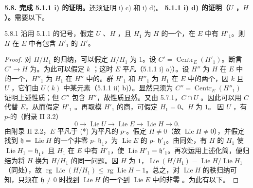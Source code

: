 \textbf{5.8. 完成 5.1.1 i) 的证明。}还须证明 i) c) 和 i) d)。
\textbf{5.1.1 i) d) 的证明（$U$ ，$H$ ）。}需要以下。
\begin{SGAresult}{}{5.8.1}
沿用 5.1.1 的记号，假定 $U$ 、$H$ ，且 $H_1$ 为 $H$ 的一个，在 $E$ 中有 $H'_1$。则 $H$ 在 $E$ 中有包含 $H'_1$ 的 $H'$。
\end{SGAresult}
\begin{proof}
对 $H/H_1$ 的归纳，可以假定 $H/H_1$ 为 $1$。设 $C'=\operatorname{Centr}_E(H'_1)$。断言 $C'\to H$ 为。为此可以假定 $k$ ；这时 $E$ 平凡（5.1.1 i) a)）。设 $H''$ 为 $H$ 在 $E$ 中的一个，$H''_1$ 为 $H_1$ 在 $H''$ 中的。群 $H'_1$ 和 $H''_1$ 为 $H_1$ 在 $E$ 中的两个，因 $k$ 且 $U$ ，它们由 $U(k)$ 中某元素（5.1.1 ii) b)）。显然只须为 $C''=\operatorname{Centr}_E(H''_1)$ 证明上述性质；但 $C''$ 包含 $H''$，故性质显然。又由 5.7.1，$C\cap U$ 。因此可以用 $C$ 代替 $E$，从而假定 $H'_1$ 。再取模 $H'_1$ 的商，可假定 $H_1=0$、$H$ 为 $1$。
因 $U$ ，有 $p$-的（附录 II 3.2）
\[0\longrightarrow\operatorname{Lie}U\longrightarrow\operatorname{Lie}E\longrightarrow\operatorname{Lie}H\longrightarrow0.\tag{*}\]
由附录 II 2.2，$E$ 平凡于 (*) 为平凡的 $p$-。假定 $H\ne0$（故 $\operatorname{Lie}H\ne0$），并假定找到 $\mathfrak h=\operatorname{Lie}H$ 的一个非零 $p$- $\mathfrak h_1$，为 $\operatorname{Lie}E$ 的 $p$- $\mathfrak h'_1$。由同处，有 $H$ 的 $H_1$ 使 $\operatorname{Lie}H_1=\mathfrak h_1$，且 $H_1$ 在 $E$ 中有 $H'_1$，使 $\operatorname{Lie}H'_1=\mathfrak h'_1$。再次运用上述化简，便归结为将 $H$ 换为 $H/H_1$ 的同一问题。因 $H$ 为 $1$，$\operatorname{Lie}(H/H_1)=\operatorname{Lie}H/\operatorname{Lie}H_1$（同处），故 $\operatorname{rg}\operatorname{Lie}(H/H_1)\leq\operatorname{rg}\operatorname{Lie}H-1$。总之，对 $\operatorname{Lie}H$ 的秩归纳可知，只须在 $\mathfrak h\ne0$ 时找到 $\operatorname{Lie}H$ 的一个到 $\operatorname{Lie}E$ 中的非零 。为此有以下。
\end{proof}
